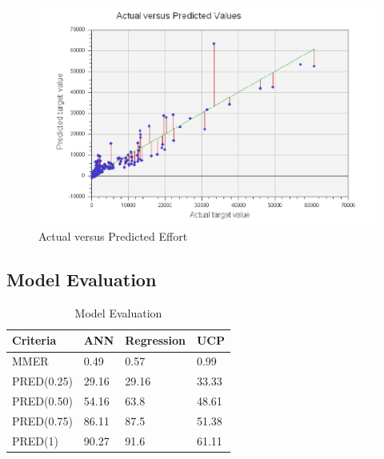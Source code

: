\documentclass[8pt,twocolumn]{article}
\begin{document}
{{{\begin{figure}[tbp]
\begin{center}
\includegraphics[natwidth=500,natheight=250]{Sources/Images/3.png}
\caption{Actual versus Predicted Effort}
\label{fig3}
\end{center}
\end{figure}

\subsection{Model Evaluation}
\label{sub6b}
\vspace{0.5cm}
\begin{table}[h]
\small
\centering
\caption{Model Evaluation}
\vspace{0.5cm}
\label{table5}
\begin{tabular}{|p{1.65cm}|p{1cm}|p{1.35cm}|p{1cm}|}
\hline
Criteria & ANN & Regression & UCP\\
\hline
MMER & 0.49 & 0.57 & 0.99\\
\hline
PRED(0.25) & 29.16 & 29.16 & 33.33\\
\hline
PRED(0.50) & 54.16 & 63.8 & 48.61\\
\hline
PRED(0.75) & 86.11 & 87.5 & 51.38\\
\hline
PRED(1) & 90.27 & 91.6 & 61.11\\
\hline
\end{tabular}
\end{table}

}}}
\end{document}
